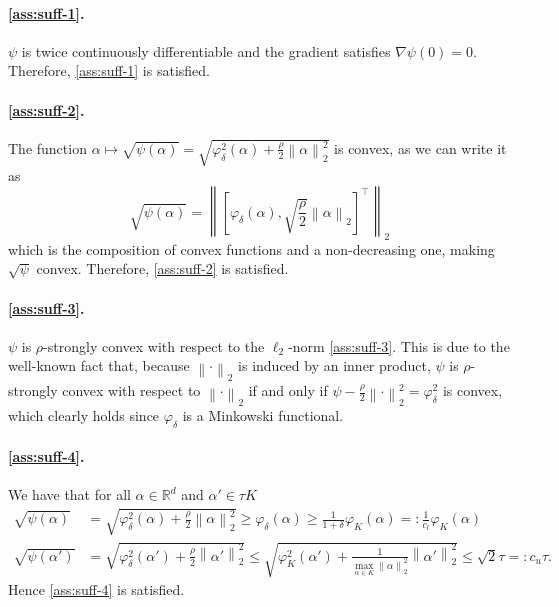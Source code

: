 \documentclass[a4paper]{article}
\newcommand{\br}[1]{\left[#1\right]}
\newcommand{\norm}[1]{\left\|#1\right\|}
\newcommand{\RR}[0]{\mathbb{R}}
\theoremstyle{thmstyle}
\theoremstyle{defstyle}
\theoremstyle{remark}
\begin{document}
    \paragraph{\ref{ass:suff-1}.} $\psi$ is twice continuously differentiable and the gradient satisfies $\nabla \psi(0) =0$. Therefore, \ref{ass:suff-1} is satisfied.
    
    \paragraph{\ref{ass:suff-2}.} The function $\alpha\mapsto \sqrt{\psi(\alpha)}=\sqrt{\varphi_\delta^2(\alpha)+\frac{\rho}{2}\norm{\alpha}_2^2}$ is convex, as we can write it as \begin{equation*}
        \sqrt{\psi(\alpha)}=\norm{\br{\varphi_\delta(\alpha),\sqrt{\frac{\rho}{2}}\norm{\alpha}_2}^\top}_2
    \end{equation*}
    which is the composition of convex functions and a non-decreasing one, making $\sqrt{\psi}$ convex. Therefore, \ref{ass:suff-2} is satisfied.
        
    \paragraph{\ref{ass:suff-3}.} $\psi$ is $\rho$-strongly convex with respect to the $\ell_2$-norm \ref{ass:suff-3}. This is due to the well-known fact \citep{Nikodem2011characterization} that, because $\norm{\cdot}_2$ is induced by an inner product, $\psi$ is $\rho$-strongly convex with respect to $\norm{\cdot}_2$ if and only if $\psi-\frac{\rho}{2}\norm{\cdot}_2^2=\varphi_\delta^2$ is convex, which clearly holds since $\varphi_\delta$ is a Minkowski functional.

    \paragraph{\ref{ass:suff-4}.} We have that for all $\alpha\in \RR^d$ and $\alpha' \in \tau K$
    \begin{align*}
        \sqrt{\psi(\alpha)}&=\sqrt{\varphi_\delta^2(\alpha)+\frac{\rho}{2}\norm{\alpha}_2^2}\geq \varphi_\delta(\alpha) \geq \frac{1}{1+\delta} \varphi_K(\alpha)=: \frac{1}{c_l} \varphi_K(\alpha) \\
        \sqrt{\psi(\alpha')} &=\sqrt{\varphi_\delta^2(\alpha')+\frac{\rho}{2}\norm{\alpha'}_2^2} \leq \sqrt{\varphi_K^2(\alpha')+\frac{1}{\max_{\alpha\in K}\norm{\alpha}_2^2}\norm{\alpha'}_2^2} \leq \sqrt{2}\tau=: c_u \tau.
    \end{align*}
    Hence \ref{ass:suff-4} is satisfied.
\end{document}
